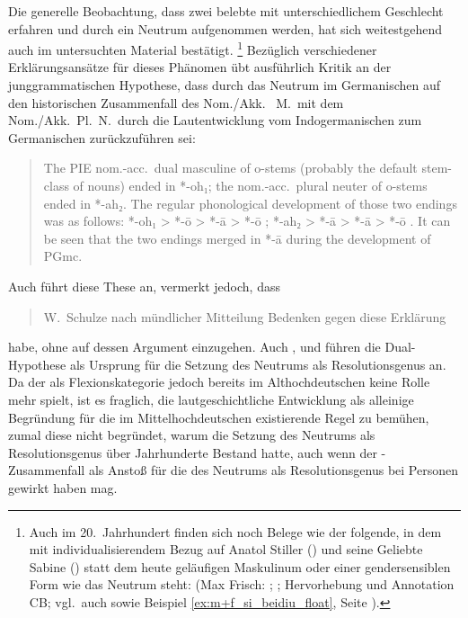 Die generelle Beobachtung, dass zwei belebte  mit
unterschiedlichem Geschlecht  erfahren und durch ein
Neutrum aufgenommen werden, hat sich weitestgehend auch im untersuchten
Material bestätigt.%
%
	\footnote{Auch im 20.~Jahrhundert finden sich noch
		Belege wie der folgende, in dem mit
		individualisierendem Bezug auf Anatol Stiller
		(\MascM) und seine Geliebte Sabine (\FemF) statt dem heute geläufigen
		Maskulinum oder einer gendersensiblen Form wie 
		das Neutrum steht:  (Max Frisch:
		; \cite[332--333]{frisch:stiller}; Hervorhebung und
		Annotation CB; vgl.~auch \cite[188]{dal2014} sowie Beispiel
		\ref{ex:m+f_si_beidiu_float}, Seite \pageref{ex:m+f_si_beidiu_float}).
	}
%
Bezüglich verschiedener Erklärungs\-ansätze für dieses Phänomen übt
\citet[213--221]{askedal1973} ausführlich Kritik an der junggrammatischen
Hypothese, dass  durch das Neutrum im
Germanischen auf den historischen Zusammenfall
des Nom./Akk.\  M.\ mit dem Nom./Akk.~Pl.~N.\ durch die
Laut\-entwicklung vom Indogermanischen zum
Germanischen zurückzuführen sei:
\foreignblockcquote{english}[196]{ringe2017}{The PIE nom.-acc.\ dual
masculine of o-stems (probably the default stem-class of nouns)
ended in *-oh₁; the nom.-acc.\ plural neuter of o-stems ended in *-ah₂. The
regular phonological development of those two endings was as follows: *-oh₁ >
*-ō \textelp{} > *-ā > *-ō \textelp{}; *-ah₂ > *-ā \textelp{} > *-ā > *-ō
\textelp{}. It can be seen that the two endings merged in *-ā during the
development of PGmc.}

Auch \citeauthor{behaghel1928} führt diese These an, vermerkt jedoch, dass
\blockcquote[40]{behaghel1928}{W.~Schulze \textelp{} nach mündlicher Mitteilung
Bedenken gegen diese Erklärung} habe, ohne auf dessen Argument einzugehen. Auch
\citet[157]{hock2008}, \citet[196]{ringe2017} und \citet[104]{miller2019}
führen die Dual-Hypothese als Ursprung für die Setzung des Neutrums als
Resolutionsgenus an. Da der  als
Flexionskategorie jedoch bereits im Althochdeutschen keine
Rolle mehr spielt, ist es fraglich, die lautgeschichtliche Entwicklung als
alleinige Begründung für die im Mittel\-hoch\-deutschen
existierende Regel zu bemühen, zumal diese nicht begründet, warum die Setzung
des Neutrums als Resolutionsgenus über Jahrhunderte
Bestand hatte, auch wenn der -Zusammenfall als Anstoß für die
 des Neutrums als Resolutionsgenus bei Personen gewirkt haben mag.

